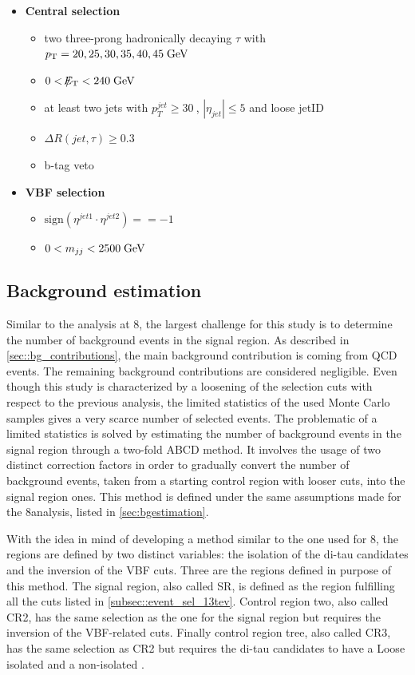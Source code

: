 \begin{itemize}
	\item \textbf{Central selection}
	\begin{itemize}
		\item two three-prong hadronically decaying $\tau$ with $p_{\text{T}} = 20,25,30,35,40,45\;\text{Ge}\kern-0.06667em\text{V}$
		\item $0 < \slash\mkern-12mu{E}_{\text{T}} < 240\;\text{Ge}\kern-0.06667em\text{V}$
		\item at least two jets with $p_{T}^{jet}\geq30~$\gev, $|\eta_{jet}|\leq5$ and loose jetID
		\item $\Delta R(jet,\tau)\geq0.3$
		\item b-tag veto
	\end{itemize}
	\item \textbf{VBF selection}
	\begin{itemize}
		\item $\text{sign}(\eta^{jet 1}\cdot\eta^{jet 2})==-1$
		\item $ 0 < m_{jj} < 2500\;\text{Ge}\kern-0.06667em\text{V}$
	\end{itemize}
\end{itemize}

\subsection{Background estimation}

Similar to the analysis at 8\tev, the largest challenge for this study is to determine the number of background events in the signal region. As described in \autoref{sec::bg_contributions}, the main background contribution is coming from QCD events. The remaining background contributions are considered negligible. Even though this study is characterized by a loosening of the selection cuts with respect to the previous analysis, the limited statistics of the used Monte Carlo samples gives a very scarce number of selected events. The problematic of a limited statistics is solved by estimating the number of background events in the signal region through a two-fold ABCD method. It involves the usage of two distinct correction factors in order to gradually convert the number of background events, taken from a starting control region with looser cuts, into the signal region ones. This method is defined under the same assumptions made for the 8\tev analysis, listed in \autoref{sec:bgestimation}.

With the idea in mind of developing a method similar to the one used for 8\tev, the regions are defined by two distinct variables: the isolation of the di-tau candidates and the inversion of the VBF cuts. Three are the regions defined in purpose of this method. The signal region, also called SR, is defined as the region fulfilling all the cuts listed in \autoref{subsec::event_sel_13tev}. Control region two, also called CR2, has the same selection as the one for the signal region but requires the inversion of the VBF-related cuts. Finally control region tree, also called CR3, has the same selection as CR2 but requires the di-tau candidates to have a Loose isolated and a non-isolated \hadtau.

